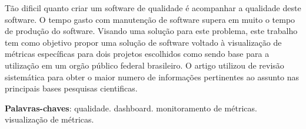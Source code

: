 \begin{resumo}
Tão dificil quanto criar um software de qualidade é acompanhar a qualidade deste software. O tempo gasto com manutenção de software supera em muito o tempo de produção do software. Visando uma solução para este problema, este trabalho tem como objetivo propor uma solução de software voltado à visualização de métricas específicas para dois projetos escolhidos como sendo base para a utilização em um orgão público federal brasileiro. O artigo utilizou de revisão sistemática para obter o maior numero de informações pertinentes ao assunto nas principais bases pesquisas cientificas.

 \vspace{\onelineskip}
 
    
 \noindent
 \textbf{Palavras-chaves}: qualidade. dashboard. monitoramento de métricas. visualização de métricas.
\end{resumo}
